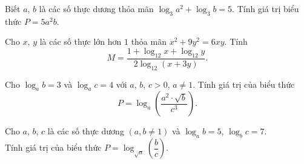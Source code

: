 
\begin{ex}%
	Biết $a$, $b$ là các số thực dương thỏa mãn $\log_3 a^2+\log_3  b=5$. Tính giá trị biểu thức $P=5a^2b$.
\end{ex}

\begin{ex}%
	Cho $ x,\,y$ là các số thực lớn hơn $  1$ thỏa mãn $x^2+9y^2=6xy$. Tính $$ M=\dfrac{1+\log_{12}x+\log_{12}y}{2\log_{12}\left(x+3y\right)}.$$
\end{ex}

\begin{ex}%
	Cho $\log_a b =3$ và $\log_a c =4$ với $a$,  $b$, $c>0$, $a\ne 1$. Tính giá trị của biểu thức
	$$P=\log_a  \left( \dfrac{a^2\cdot \sqrt{b}}{c^3}\right).$$
\end{ex}

\begin{ex}%
	Cho $a$,  $b$, $c$ là các số thực dương $(a, b\ne 1)$ và $\log_ab=5$, $\log_bc=7$.\\
	Tính giá trị của  biểu thức $P=\log_{\sqrt{a}}\left(\dfrac{b}{c}\right)$.
\end{ex}

